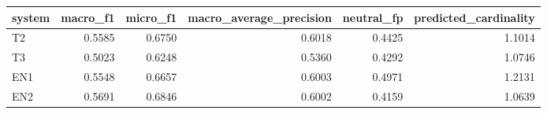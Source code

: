 \begin{tabular}{lrrrrr}
\toprule
system & macro_f1 & micro_f1 & macro_average_precision & neutral_fp & predicted_cardinality \\
\midrule
T2 & 0.5585 & 0.6750 & 0.6018 & 0.4425 & 1.1014 \\
T3 & 0.5023 & 0.6248 & 0.5360 & 0.4292 & 1.0746 \\
EN1 & 0.5548 & 0.6657 & 0.6003 & 0.4971 & 1.2131 \\
EN2 & 0.5691 & 0.6846 & 0.6002 & 0.4159 & 1.0639 \\
\bottomrule
\end{tabular}
